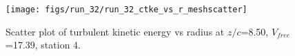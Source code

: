 \begin{figure}[H]
\centering
\texttt{[image: figs/run\_32/run\_32\_ctke\_vs\_r\_meshscatter]}
\caption{Scatter plot of turbulent kinetic energy vs radius at $z/c$=8.50, $V_{free}$=17.39, station 4.}
\label{fig:run_32_ctke_vs_r_meshscatter}
\end{figure}



